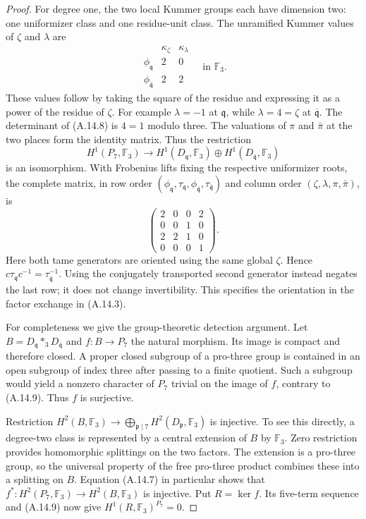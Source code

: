 \begin{proof}
For degree one, the two local Kummer groups each have dimension
two: one uniformizer class and one residue-unit class. The
unramified Kummer values of $\zeta$ and $\lambda$ are
\[
 \begin{array}{c|cc}
 &\kappa_\zeta&\kappa_\lambda\\\hline
 \phi_{\mathfrak q}&2&0\\
 \phi_{\bar{\mathfrak q}}&2&2
 \end{array}\quad\text{in }\mathbb F_3.
 \tag{A.14.8}
\]
These values follow by taking the square of the residue and
expressing it as a power of the residue of $\zeta$. For example
$\lambda=-1$ at $\mathfrak q$, while $\lambda=4=\zeta$ at
$\overline{\mathfrak q}$. The determinant of (A.14.8) is
$4=1$ modulo three. The valuations of $\pi$ and $\bar\pi$
at the two places form the identity matrix. Thus the restriction
\[
 H^1(P_7,\mathbb F_3)\longrightarrow
 H^1(D_{\mathfrak q},\mathbb F_3)
       \oplus H^1(D_{\overline{\mathfrak q}},\mathbb F_3)
 \tag{A.14.9}
\]
is an isomorphism. With Frobenius lifts fixing the respective
uniformizer roots, the complete matrix, in row order
$(\phi_{\mathfrak q},\tau_{\mathfrak q},
\phi_{\bar{\mathfrak q}},\tau_{\bar{\mathfrak q}})$ and column
order $(\zeta,\lambda,\pi,\bar\pi)$, is
\[
 \begin{pmatrix}
 2&0&0&2\\0&0&1&0\\2&2&1&0\\0&0&0&1
 \end{pmatrix}.
 \tag{A.14.10}
\]
Here both tame generators are oriented using the same global
$\zeta$. Hence $c\tau_{\mathfrak q}c^{-1}
=\tau_{\bar{\mathfrak q}}^{-1}$. Using the conjugately
transported second generator instead negates the last row; it
does not change invertibility. This specifies the orientation
in the factor exchange in (A.14.3).

For completeness we give the group-theoretic detection argument.
Let $B=D_{\mathfrak q}*_{3}D_{\overline{\mathfrak q}}$ and
$f:B\to P_7$ the natural morphism. Its image is compact and
therefore closed. A proper closed subgroup of a pro-three group
is contained in an open subgroup of index three after passing
to a finite quotient. Such a subgroup would yield a nonzero
character of $P_7$ trivial on the image of $f$, contrary to
(A.14.9). Thus $f$ is surjective.

Restriction $H^2(B,\mathbb F_3)\to\bigoplus_{\mathfrak p\mid7}
H^2(D_{\mathfrak p},\mathbb F_3)$ is injective. To see this
directly, a degree-two class is represented by a central
extension of $B$ by $\mathbb F_3$. Zero restriction provides
homomorphic splittings on the two factors. The extension is a
pro-three group, so the universal property of the free pro-three
product combines these into a splitting on $B$. Equation
(A.14.7) in particular shows that
$f^*:H^2(P_7,\mathbb F_3)\to H^2(B,\mathbb F_3)$ is injective.
Put $R=\ker f$. Its five-term sequence and (A.14.9) now give
$H^1(R,\mathbb F_3)^{P_7}=0$.


\end{proof}
